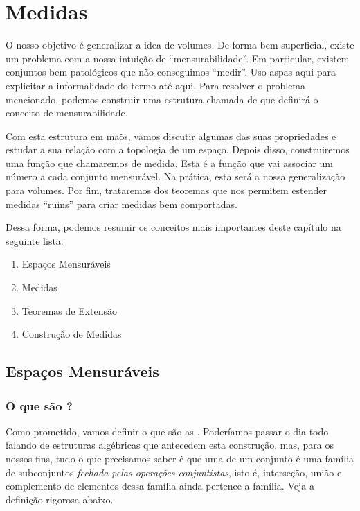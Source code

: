 \chapter{Medidas}

O nosso objetivo é generalizar a idea de volumes. De forma bem superficial, existe um problema com a nossa intuição de ``mensurabilidade''. Em particular, existem conjuntos bem patológicos que não conseguimos ``medir''. Uso aspas aqui para explicitar a informalidade do termo até aqui. Para resolver o problema mencionado, podemos construir uma estrutura chamada de \sigmaAlg que definirá o conceito de mensurabilidade.

Com esta estrutura em maõs, vamos discutir algumas das suas propriedades e estudar a sua relação com a topologia de um espaço. Depois disso, construiremos uma função que chamaremos de medida. Esta é a função que vai associar um número a cada conjunto mensurável. Na prática, esta será a nossa generalização para volumes. Por fim, trataremos dos teoremas que nos permitem estender medidas ``ruins'' para criar medidas bem comportadas.

Dessa forma, podemos resumir os conceitos mais importantes deste capítulo na seguinte lista:

\begin{enumerate}
    \item Espaços Mensuráveis
    \item Medidas
    \item Teoremas de Extensão
    \item Construção de Medidas
\end{enumerate}















\section{Espaços Mensuráveis}
\subsection*{O que são \sigmaAlgs?}
Como prometido, vamos definir o que são as \textbf{\sigmaAlgs}. Poderíamos passar o dia todo falando de estruturas algébricas que antecedem esta construção, mas, para os nossos fins, tudo o que precisamos saber é que uma \sigmaAlg de um conjunto é uma família de subconjuntos \textit{fechada pelas operações conjuntistas}, isto é, interseção, união e complemento de elementos dessa família ainda pertence a família. Veja a definição rigorosa abaixo.

